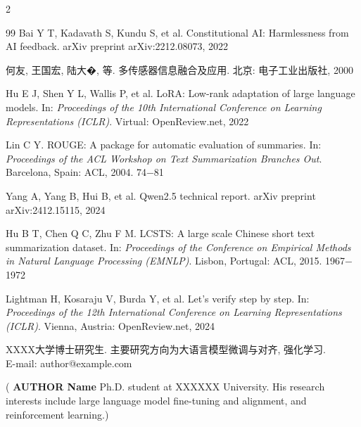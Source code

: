 \documentclass{aas}
\begin{document}
\begin{multicols}{2}
\begin{thebibliography}{99}
 Bai Y T, Kadavath S, Kundu S, et al. Constitutional AI: Harmlessness from AI feedback. arXiv preprint arXiv:2212.08073, 2022

 何友, 王国宏, 陆大�, 等. 多传感器信息融合及应用. 北京: 电子工业出版社, 2000

 Hu E J, Shen Y L, Wallis P, et al. LoRA: Low-rank adaptation of large language models. In: {\sl Proceedings of the 10th International Conference on Learning Representations (ICLR)}. Virtual: OpenReview.net, 2022

 Lin C Y. ROUGE: A package for automatic evaluation of summaries. In: {\sl Proceedings of the ACL Workshop on Text Summarization Branches Out}. Barcelona, Spain: ACL, 2004. 74$-$81

 Yang A, Yang B, Hui B, et al. Qwen2.5 technical report. arXiv preprint arXiv:2412.15115, 2024

 Hu B T, Chen Q C, Zhu F M. LCSTS: A large scale Chinese short text summarization dataset. In: {\sl Proceedings of the Conference on Empirical Methods in Natural Language Processing (EMNLP)}. Lisbon, Portugal: ACL, 2015. 1967$-$1972

 Lightman H, Kosaraju V, Burda Y, et al. Let's verify step by step. In: {\sl Proceedings of the 12th International Conference on Learning Representations (ICLR)}. Vienna, Austria: OpenReview.net, 2024

\end{thebibliography}

\begin{biography}
\quad
XXXX大学博士研究生.
主要研究方向为大语言模型微调与对齐, 强化学习. \\ E-mail: author@example.com

\noindent({\bf
AUTHOR Name
}\quad
Ph.D. student at XXXXXX University. His research interests include large language model fine-tuning and alignment, and reinforcement learning.)
\end{biography}

\end{multicols}
\end{document}
